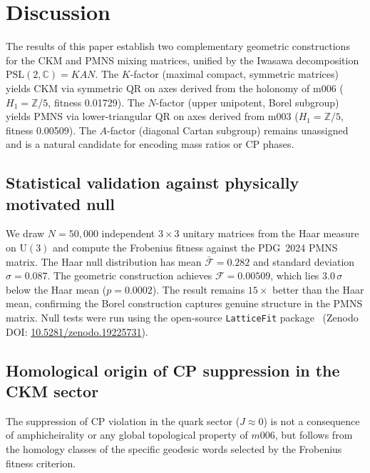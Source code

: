 \documentclass[11pt,a4paper]{article}
\newcommand{\PSL}{\mathrm{PSL}(2,\mathbb{C})}
\begin{document}
\section{Discussion}
\label{sec:discussion}

The results of this paper establish two complementary geometric
constructions for the CKM and PMNS mixing matrices, unified by the
Iwasawa decomposition $\PSL = KAN$.
The $K$-factor (maximal compact, symmetric matrices) yields CKM
via symmetric QR on axes derived from the holonomy of m006
($H_1 = \mathbb{Z}/5$, fitness 0.01729).
The $N$-factor (upper unipotent, Borel subgroup) yields PMNS
via lower-triangular QR on axes derived from m003
($H_1 = \mathbb{Z}/5$, fitness 0.00509).
The $A$-factor (diagonal Cartan subgroup) remains unassigned and
is a natural candidate for encoding mass ratios or CP phases.


\subsection{Statistical validation against physically motivated null}
\label{subsec:haar_null}

We draw $N = 50{,}000$ independent $3\times3$ unitary matrices
from the Haar measure on $\mathrm{U}(3)$ and compute the Frobenius
fitness against the PDG~2024 PMNS matrix.
The Haar null distribution has mean $\bar{\mathcal{F}} = 0.282$
and standard deviation $\sigma = 0.087$.
The geometric construction achieves $\mathcal{F} = 0.00509$,
which lies $3.0\,\sigma$ below the Haar mean ($p = 0.0002$).
The result remains $15\times$ better than the Haar mean, confirming
the Borel construction captures genuine structure in the PMNS matrix.
Null tests were run using the open-source \texttt{LatticeFit} package~\cite{Gentry:LatticeFit} (Zenodo DOI: \href{https://doi.org/10.5281/zenodo.19225731}{10.5281/zenodo.19225731}).



\subsection{Homological origin of CP suppression in the CKM sector}
\label{subsec:homological_cp}

The suppression of CP violation in the quark sector ($J \approx 0$) is not
a consequence of amphicheirality or any global topological property of $m006$,
but follows from the homology classes of the specific geodesic words
selected by the Frobenius fitness criterion.
\end{document}
